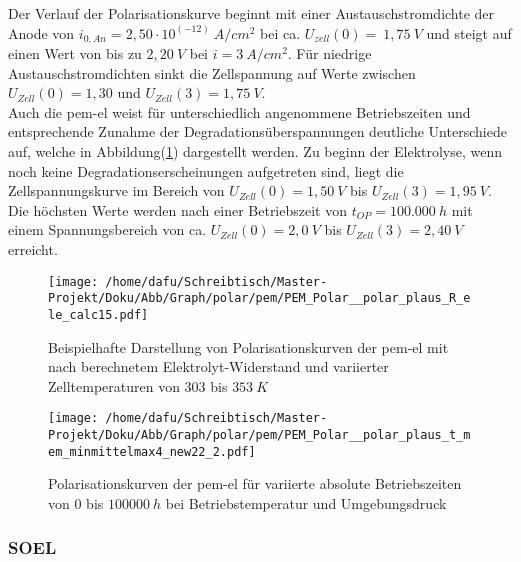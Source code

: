 \documentclass[onecolumn,10pt,titlepage]{article}
\begin{document}
Der Verlauf der Polarisationskurve beginnt mit einer Austauschstromdichte der Anode von $i_{0,An}=2,50\cdot10^{(-12)}~A/cm^2 $ bei ca. $U_{zell}(0)=~1,75~V$ und steigt auf einen Wert von bis zu $2,20~V$ bei $i=3~A/cm^2$. Für niedrige Austauschstromdichten sinkt die Zellspannung auf Werte zwischen  $U_{Zell}(0)=1,30$ und $U_{Zell}(3)=1,75~V$.\\
Auch die \gls{pem}-\gls{el} weist für unterschiedlich angenommene Betriebszeiten und entsprechende Zunahme der Degradationsüberspannungen deutliche Unterschiede auf, welche in Abbildung(\ref{fig:polk_PEM_tmemvar}) dargestellt werden. Zu beginn der Elektrolyse, wenn noch keine Degradationserscheinungen aufgetreten sind, liegt die Zellspannungskurve im Bereich von  $U_{Zell}(0)=1,50~V$ bis $U_{Zell}(3)=1,95~V$. Die höchsten Werte werden nach einer Betriebszeit von $t_{OP}=100.000~h$ mit einem Spannungsbereich von ca. $U_{Zell}(0)=2,0~V$ bis $U_{Zell}(3)=2,40~V$ erreicht.

\begin{figure}[!tbp]
	\centering
	\begin{minipage}[t]{0.49\textwidth}
		\texttt{[image: /home/dafu/Schreibtisch/Master-Projekt/Doku/Abb/Graph/polar/pem/PEM\_Polar\_\_polar\_plaus\_R\_ele\_calc15.pdf]}

		\caption[Beispielhafte Darstellung von Polarisationskurven der \gls{pem}-\gls{el}bzgl.Elektrolyt-Widerstand]{Beispielhafte Darstellung von Polarisationskurven der \gls{pem}-\gls{el} mit nach \cite{Chandesris2015} berechnetem Elektrolyt-Widerstand und variierter Zelltemperaturen von $303$ bis $353~K$}
		\label{fig:polk_PEM_Tvar_ReleCalc}
	\end{minipage}
	\hfill
	\begin{minipage}[t]{0.49\textwidth}
		\texttt{[image: /home/dafu/Schreibtisch/Master-Projekt/Doku/Abb/Graph/polar/pem/PEM\_Polar\_\_polar\_plaus\_t\_mem\_minmittelmax4\_new22\_2.pdf]}

		\caption[Polarisationskurven der \gls{pem}-\gls{el} für variierte absolute Betriebszeiten]{Polarisationskurven der \gls{pem}-\gls{el} für variierte absolute Betriebszeiten von $0$ bis $100000~h$ bei Betriebstemperatur und Umgebungsdruck}
		\label{fig:polk_PEM_tmemvar}
	\end{minipage}
\end{figure}



\subsubsection*{SOEL}
\end{document}

